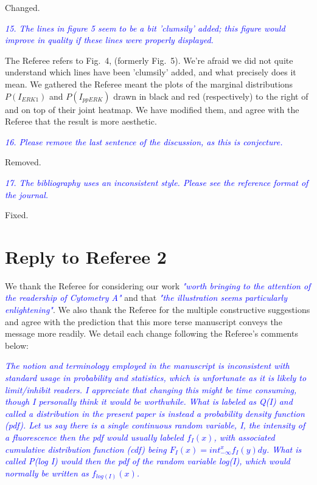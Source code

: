 \documentclass[letter,11pt,draft]{article}
\newcommand{\re}[1]{\emph{\textcolor{blue}{#1}}}
\begin{document}
\smallskip
Changed.

\re{
15. The lines in figure 5 seem to be a bit 'clumsily' added; this figure would improve in quality if these lines were properly displayed.
}

\smallskip
The Referee refers to Fig.~4, (formerly Fig.~5). We're afraid we did not quite understand which lines have been 'clumsily' added, and what precisely does it mean. We gathered the Referee meant the plots of the marginal distributions $P(I_{ERK1})$ and $P(I_{ppERK})$ drawn in black and red (respectively) to the right of and on top of their joint heatmap. We have modified them, and agree with the Referee that the result is more aesthetic.

\re{
16. Please remove the last sentence of the discussion, as this is conjecture.
}

\smallskip
Removed.

\re{
17. The bibliography uses an inconsistent style. Please see the reference format of the journal.
}

\smallskip
Fixed.

\newpage

\section*{Reply to Referee 2}

We thank the Referee for considering our work \re{"worth bringing to the attention of the readership of Cytometry A"} and that \re{"the illustration seems particularly enlightening"}. We also thank the Referee for the multiple constructive suggestions and agree with the prediction that this more terse manuscript conveys the message more readily. We detail each change following the Referee's comments below:

\smallskip
\re{The notion and terminology employed in the manuscript is inconsistent with standard usage in probability and statistics, which is unfortunate as it is likely to limit/inhibit readers. I appreciate that changing this might be time consuming, though I personally think it would be worthwhile.
}
\re{What is labeled as Q(I) and called a distribution in the present paper is instead a probability density function (pdf). Let us say there is a single continuous random variable, I, the intensity of a fluorescence then the pdf would usually labeled $f_I(x)$, with associated cumulative distribution function (cdf) being $F_I(x) = int_{-\infty}^x f_I(y) dy$. What is called P(log I) would then the pdf of the random variable log(I), which would normally be written as $f_{log(I)}(x)$.}
\end{document}
